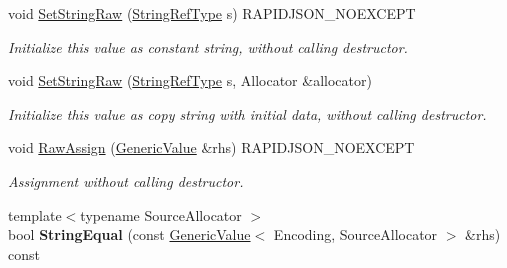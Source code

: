 \begin{DoxyCompactItemize}
void \hyperlink{classGenericValue_a1451603922dcdf34976f125dc60f70ee}{Set\+String\+Raw} (\hyperlink{classGenericValue_a32e0f30ee278072374c8168b14d3317f}{String\+Ref\+Type} s) R\+A\+P\+I\+D\+J\+S\+O\+N\+\_\+\+N\+O\+E\+X\+C\+E\+PT
\begin{DoxyCompactList}\small\item\em Initialize this value as constant string, without calling destructor. \end{DoxyCompactList}\item 
\mbox{\label{classGenericValue_ad3d91db36dfdbfc1af40a79aae07723c}} 
void \hyperlink{classGenericValue_ad3d91db36dfdbfc1af40a79aae07723c}{Set\+String\+Raw} (\hyperlink{classGenericValue_a32e0f30ee278072374c8168b14d3317f}{String\+Ref\+Type} s, Allocator \&allocator)
\begin{DoxyCompactList}\small\item\em Initialize this value as copy string with initial data, without calling destructor. \end{DoxyCompactList}\item 
\mbox{\label{classGenericValue_abb8ea2dfbe74ff4ee7dac6be31317f81}} 
void \hyperlink{classGenericValue_abb8ea2dfbe74ff4ee7dac6be31317f81}{Raw\+Assign} (\hyperlink{classGenericValue}{Generic\+Value} \&rhs) R\+A\+P\+I\+D\+J\+S\+O\+N\+\_\+\+N\+O\+E\+X\+C\+E\+PT
\begin{DoxyCompactList}\small\item\em Assignment without calling destructor. \end{DoxyCompactList}\item 
\mbox{\label{classGenericValue_ad4d088dc601d99fea9d16300a7ec7ee1}} 
{\footnotesize template$<$typename Source\+Allocator $>$ }\\bool {\bfseries String\+Equal} (const \hyperlink{classGenericValue}{Generic\+Value}$<$ Encoding, Source\+Allocator $>$ \&rhs) const
\end{DoxyCompactItemize}
